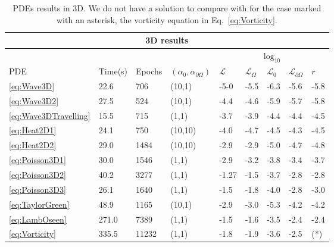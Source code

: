 \documentclass{article}
\newcommand{\mc}{\mathcal}
\begin{document}
\begin{table}
\begin{center}
\renewcommand{\arraystretch}{1.5}
\begin{tabular}{ |p{1cm}|p{1.3cm}|p{1.3cm}|p{1.3cm}|p{1.0cm}|p{1.0cm}|p{1.0cm}|p{1.0cm}|p{1.0cm}|  }
\hline
\multicolumn{9}{|c|}{3D results} \\
\hline
\multicolumn{4}{|c|}{}&\multicolumn{5}{|c|}{$\log_{10}$}\\
\hline
PDE    & Time(s)& Epochs & $(\alpha_0,\alpha_{\partial \Omega})$ & $\mc{L}$ &$\mc{L}_{\Omega}$ &$\mc{L}_0$ &$\mc{L}_{\partial\Omega}$ & $r$ \\
\hline
\ref{eq:Wave3D}            &  22.6   & 706  & (10,1)  & -5-0  & -5.5  & -6.3  & -5.6  & -5.8  \\
\hline
\ref{eq:Wave3D2}           &  27.5   & 524  & (10,1)  & -4.4  & -4.6  & -5.9  & -5.7  & -5.8  \\
\hline
\ref{eq:Wave3DTravelling}  &  15.5   & 715  & (1,1)   & -3.7  & -3.9  & -4.4  & -4.4  & -4.5  \\
\hline
\ref{eq:Heat2D1}           &  24.1   & 750  & (10,10) & -4.0  & -4.7  & -4.5  & -4.3  & -4.5  \\
\hline
\ref{eq:Heat2D2}           &  29.0   & 1484 & (10,10) & -2.9  & -2.9  & -5.0  & -4.7  & -4.8  \\
\hline
\ref{eq:Poisson3D1}        &  30.0   & 1546 & (1,1)   & -2.9  & -3.2  & -3.8  & -3.4  & -3.7  \\
\hline
\ref{eq:Poisson3D2}        &  40.2   & 3277 & (1,1)   & -1.27 & -1.5  & -3.7  & -2.8  & -2.8  \\
\hline
\ref{eq:Poisson3D3}        &  26.1   & 1640  & (1,1)  & -1.5  & -1.8  & -4.0  & -2.8  & -3.0  \\
\hline
\ref{eq:TaylorGreen}       &  48.9   & 1165  & (10,1) & -2.9  & -3.0  & -5.3  & -4.2  & -4.2  \\
\hline
\ref{eq:LambOseen}         &  271.0  & 7389  & (1,1)  & -1.5  & -1.6  & -3.5  & -2.4  & -2.4  \\
\hline
\ref{eq:Vorticity}         &  335.5  & 11232 & (1,1)  & -1.8  & -1.9  & -3.6  & -2.5  & (*) \\
\hline 
\end{tabular}
\caption{PDEs results in 3D. We do not have a solution to compare with for the case marked with an asterisk, the vorticity equation in Eq.~\ref{eq:Vorticity}.
\label{tab:3D}}
\end{center}
\end{table}
\end{document}

